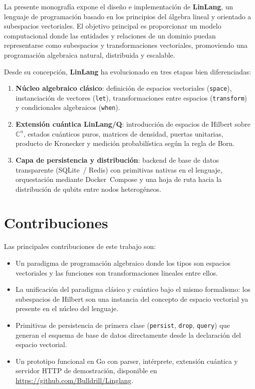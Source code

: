 \documentclass[12pt, a4paper, openany]{report}
\theoremstyle{definition}
\newcommand{\linlang}{\textbf{LinLang}}
\newcommand{\linlangQ}{\textbf{LinLang/Q}}
\begin{document}
La presente monografía expone el diseño e implementación de \linlang{}, un lenguaje de programación basado en los principios del álgebra lineal y orientado a subespacios vectoriales. El objetivo principal es proporcionar un modelo computacional donde las entidades y relaciones de un dominio puedan representarse como subespacios y transformaciones vectoriales, promoviendo una programación algebraica natural, distribuida y escalable.

Desde su concepción, \linlang{} ha evolucionado en tres etapas bien diferenciadas:

\begin{enumerate}
  \item \textbf{Núcleo algebraico clásico}: definición de espacios vectoriales (\texttt{space}), instanciación de vectores (\texttt{let}), transformaciones entre espacios (\texttt{transform}) y condicionales algebraicos (\texttt{when}).
  \item \textbf{Extensión cuántica \linlangQ{}}: introducción de espacios de Hilbert sobre $\mathbb{C}^n$, estados cuánticos puros, matrices de densidad, puertas unitarias, producto de Kronecker y medición probabilística según la regla de Born.
  \item \textbf{Capa de persistencia y distribución}: backend de base de datos transparente (SQLite~/ Redis) con primitivas nativas en el lenguaje, orquestación mediante Docker~Compose y una hoja de ruta hacia la distribución de qubits entre nodos heterogéneos.
\end{enumerate}

\section{Contribuciones}

Las principales contribuciones de este trabajo son:

\begin{itemize}
  \item Un paradigma de programación algebraico donde los tipos son espacios vectoriales y las funciones son transformaciones lineales entre ellos.
  \item La unificación del paradigma clásico y cuántico bajo el mismo formalismo: los subespacios de Hilbert son una instancia del concepto de espacio vectorial ya presente en el núcleo del lenguaje.
  \item Primitivas de persistencia de primera clase (\texttt{persist}, \texttt{drop}, \texttt{query}) que generan el esquema de base de datos directamente desde la declaración del espacio vectorial.
  \item Un prototipo funcional en Go con parser, intérprete, extensión cuántica y servidor HTTP de demostración, disponible en \url{https://github.com/Bulldrill/Linglang}.
\end{itemize}
\end{document}
